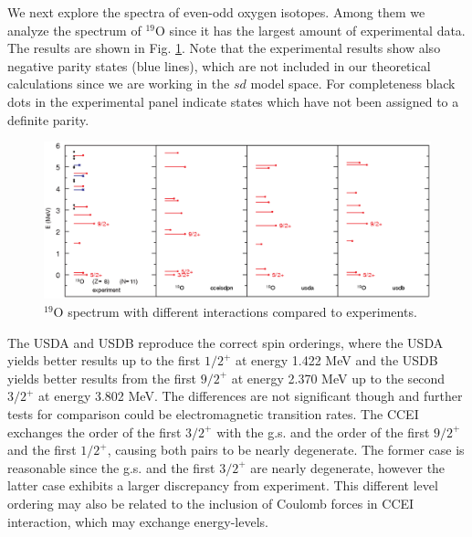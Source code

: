 We next explore the spectra of even-odd oxygen isotopes. Among them we analyze the spectrum of $^{19}$O since it has the largest amount of experimental data. The results are shown in Fig. \ref{fig:19O}. Note that the experimental results show also negative parity states (blue lines), which are not included in our theoretical calculations since we are working in the $sd$ model space. For completeness black dots in the experimental panel indicate states which have not been assigned to a definite parity.

\onecolumngrid

\begin{figure}[htb!]
\centering
\includegraphics[width=\textwidth]{19O.eps}
\caption{$^{19}$O spectrum with different interactions compared to experiments.}
\label{fig:19O}
\end{figure}

\twocolumngrid

The USDA and USDB reproduce the correct spin orderings, where the USDA yields better results up to the first $1/2^+$ at energy 1.422 MeV and the USDB yields better results from the first $9/2^+$ at energy 2.370 MeV up to the second $3/2^+$ at energy 3.802 MeV. The differences are not significant though and further tests for comparison could be electromagnetic transition rates.
The CCEI exchanges the order of the first $3/2^+$ with the g.s. and the order of the first $9/2^+$ and the first $1/2^+$, causing both pairs to be nearly degenerate. The former case is reasonable since the g.s. and the first $3/2^+$ are nearly degenerate,  however the latter case exhibits a larger discrepancy from experiment. This different level ordering may also be related to the inclusion of Coulomb forces in CCEI interaction, which may exchange energy-levels.

%
